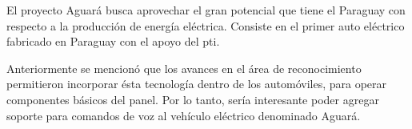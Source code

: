 El proyecto Aguar\'a busca aprovechar el gran potencial que tiene el Paraguay con respecto a la producci\'on de
energ\'ia el\'ectrica. Consiste en el primer auto el\'ectrico fabricado en Paraguay con el apoyo del \gls{pti}. 

Anteriormente se mencion\'o que los avances en el \'area de reconocimiento
permitieron incorporar \'esta tecnolog\'ia dentro de los autom\'oviles, para operar componentes b\'asicos del panel. Por lo tanto,
ser\'ia interesante poder agregar soporte para comandos de voz al veh\'iculo el\'ectrico denominado Aguar\'a.